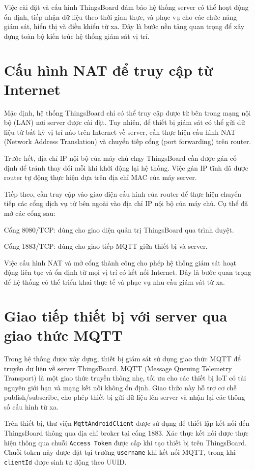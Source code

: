 \documentclass[../DoAn.tex]{subfiles}
\begin{document}
Việc cài đặt và cấu hình ThingsBoard đảm bảo hệ thống server có thể hoạt động ổn định, tiếp nhận dữ liệu theo thời gian thực, và phục vụ cho các chức năng giám sát, hiển thị và điều khiển từ xa. Đây là bước nền tảng quan trọng để xây dựng toàn bộ kiến trúc hệ thống giám sát vị trí.

\section{Cấu hình NAT để truy cập từ Internet}
\label{section:5.2}
Mặc định, hệ thống ThingsBoard chỉ có thể truy cập được từ bên trong mạng nội bộ (LAN) nơi server được cài đặt. Tuy nhiên, để thiết bị giám sát có thể gửi dữ liệu từ bất kỳ vị trí nào trên Internet về server, cần thực hiện cấu hình NAT (Network Address Translation) và chuyển tiếp cổng (port forwarding) trên router.

Trước hết, địa chỉ IP nội bộ của máy chủ chạy ThingsBoard cần được gán cố định để tránh thay đổi mỗi khi khởi động lại hệ thống. Việc gán IP tĩnh đã được router tự động thực hiện dựa trên địa chỉ MAC của máy server.

Tiếp theo, cần truy cập vào giao diện cấu hình của router để thực hiện chuyển tiếp các cổng dịch vụ từ bên ngoài vào địa chỉ IP nội bộ của máy chủ. Cụ thể đã mở các cổng sau:

Cổng 8080/TCP: dùng cho giao diện quản trị ThingsBoard qua trình duyệt.

Cổng 1883/TCP: dùng cho giao tiếp MQTT giữa thiết bị và server.

Việc cấu hình NAT và mở cổng thành công cho phép hệ thống giám sát hoạt động liên tục và ổn định từ mọi vị trí có kết nối Internet. Đây là bước quan trọng để hệ thống có thể triển khai thực tế và phục vụ nhu cầu giám sát từ xa.

\section{Giao tiếp thiết bị với server qua giao thức MQTT}
\label{section:5.3}

Trong hệ thống được xây dựng, thiết bị giám sát sử dụng giao thức MQTT để truyền dữ liệu về server ThingsBoard. MQTT (Message Queuing Telemetry Transport) là một giao thức truyền thông nhẹ, tối ưu cho các thiết bị IoT có tài nguyên giới hạn và mạng kết nối không ổn định. Giao thức này hỗ trợ cơ chế publish/subscribe, cho phép thiết bị gửi dữ liệu lên server và nhận lại các thông số cấu hình từ xa.

Trên thiết bị, thư viện \texttt{MqttAndroidClient} được sử dụng để thiết lập kết nối đến ThingsBoard thông qua địa chỉ broker tại cổng 1883. Xác thực kết nối được thực hiện thông qua chuỗi \texttt{Access Token} được cấp khi tạo thiết bị trên ThingsBoard. Chuỗi token này được đặt tại trường \texttt{username} khi kết nối MQTT, trong khi \texttt{clientId} được sinh tự động theo UUID.
\end{document}
